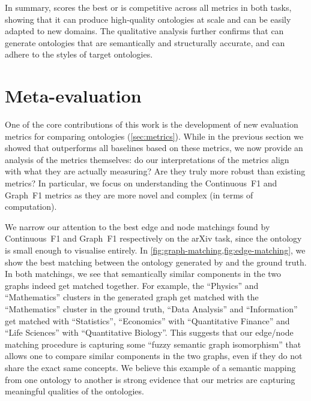 In summary, \name scores the best or is competitive across all metrics in both tasks, showing that it can produce high-quality ontologies at scale and can be easily adapted to new domains. The qualitative analysis further confirms that \name can generate ontologies that are semantically and structurally accurate, and can adhere to the styles of target ontologies.

\section{Meta-evaluation}

One of the core contributions of this work is the development of new evaluation metrics for comparing ontologies (\cref{sec:metrics}). While in the previous section we showed that \name outperforms all baselines based on these metrics, we now provide an analysis of the metrics themselves: do our interpretations of the metrics align with what they are actually measuring? Are they truly more robust than existing metrics? In particular, we focus on understanding the Continuous~F1 and Graph~F1 metrics as they are more novel and complex (in terms of computation).

We narrow our attention to the best edge and node matchings found by Continuous~F1 and Graph~F1 respectively on the arXiv task, since the ontology is small enough to visualise entirely. In \cref{fig:graph-matching,fig:edge-matching}, we show the best matching between the ontology generated by \name and the ground truth. In both matchings, we see that semantically similar components in the two graphs indeed get matched together. For example, the ``Physics'' and ``Mathematics'' clusters in the generated graph get matched with the ``Mathematics'' cluster in the ground truth, ``Data Analysis'' and ``Information'' get matched with ``Statistics'', ``Economics'' with ``Quantitative Finance'' and ``Life Sciences'' with ``Quantitative Biology''. This suggests that our edge/node matching procedure is capturing some ``fuzzy semantic graph isomorphism'' that allows one to compare similar components in the two graphs, even if they do not share the exact same concepts. We believe this example of a semantic mapping from one ontology to another is strong evidence that our metrics are capturing meaningful qualities of the ontologies.

